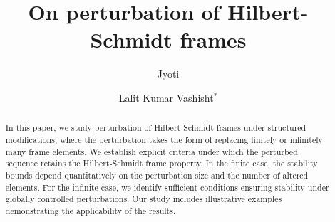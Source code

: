 \documentclass[reqno]{amsart}
\theoremstyle{plain}
\theoremstyle{remark}
\numberwithin{equation}{section}
\begin{document}
\title [Perturbation of  Hilbert-Schmidt Frames]{On perturbation of  Hilbert-Schmidt frames}

\author[Jyoti]{Jyoti}
	\address{{\bf{Jyoti}}, Department of Mathematics,
		University of Delhi, Delhi-110007, India.}


\author[Lalit   Kumar Vashisht]{Lalit  Kumar  Vashisht$^{*}$}
	\address{{\bf{Lalit  Kumar  Vashisht}}, Department of Mathematics,
		University of Delhi, Delhi-110007, India.}



\begin{abstract}
In this paper, we study perturbation of Hilbert-Schmidt frames under structured modifications, where the perturbation takes the form of replacing finitely or infinitely many frame elements. We establish explicit criteria under which the perturbed sequence retains the Hilbert-Schmidt frame property. In the finite case, the stability bounds depend quantitatively on the perturbation size and the number of altered elements. For the infinite case, we identify sufficient conditions ensuring stability under globally controlled perturbations. Our study  includes illustrative examples demonstrating the applicability of the results.
\end{abstract}



\maketitle

\baselineskip15pt
\end{document}
